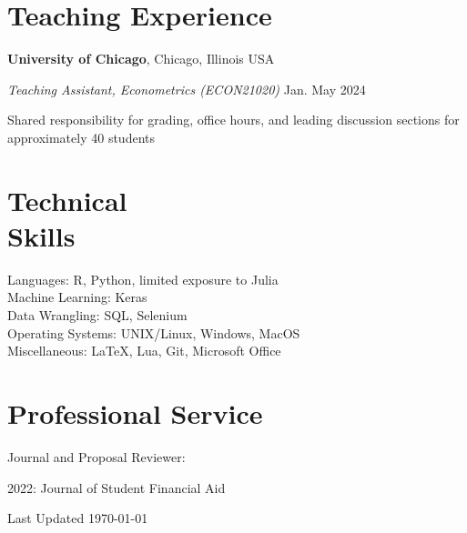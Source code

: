 \documentclass[margin,line]{res}
\newenvironment{list1}{
  \begin{list}{\ding{113}}{%
      \setlength{\itemsep}{0in}
      \setlength{\parsep}{0in} \setlength{\parskip}{0in}
      \setlength{\topsep}{0in} \setlength{\partopsep}{0in} 
      \setlength{\leftmargin}{0.17in}}}{\end{list}}
\newenvironment{list2}{
  \begin{list}{\small$\triangleright$}{%
      \setlength{\itemsep}{0in}
      \setlength{\parsep}{0in} \setlength{\parskip}{0in}
      \setlength{\topsep}{0in} \setlength{\partopsep}{0in} 
      \setlength{\leftmargin}{0.2in}}}{\end{list}}
\begin{document}
\begin{resume}
\section{\sc Teaching Experience}
{\bf University of Chicago}, Chicago, Illinois USA

\vspace{-.3cm}
{\em Teaching Assistant, Econometrics (ECON21020)} \hfill {Jan.{ \textemdash } May 2024}\\
\vspace{-.4cm}
\begin{list1}
\item[\cdot] Shared responsibility for grading, office hours, and leading discussion sections for approximately 40 students
\end{list1}


\section{\sc Technical \\ Skills} 
Languages: R, Python, limited exposure to Julia \\
Machine Learning: Keras \\ 
Data Wrangling: SQL, Selenium \\
Operating Systems:  UNIX/Linux, Windows, MacOS \\
Miscellaneous: \LaTeX, Lua, Git, Microsoft Office

\section{\sc Professional Service} 
Journal and Proposal Reviewer:
\begin{list1}
\item[\cdot] 2022: Journal of Student Financial Aid
\end{list1}

\end{resume}

\begin{center}
  \vfill
  Last Updated \today
\end{center}
\end{document}
